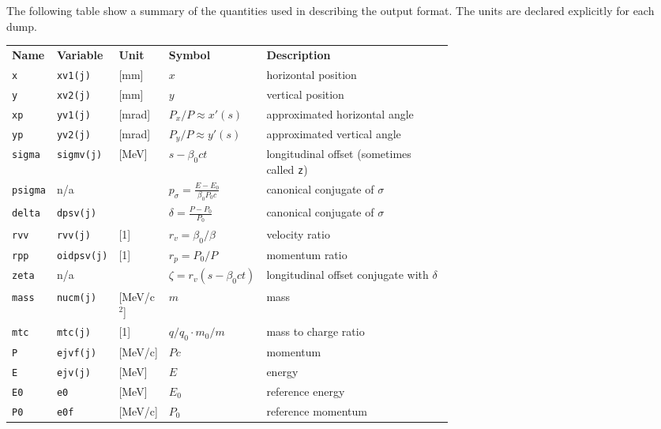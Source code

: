 The following table show a summary of the quantities used in describing the output format. The units are declared explicitly for each dump. 

\bigskip
\begin{longtabu}{@{}llllp{0.65\linewidth}}
    \textbf{Name}   & \textbf{Variable} & \textbf{Unit} & \textbf{Symbol} & \textbf{Description} \\
    \texttt{x}      & \texttt{xv1(j)}    & [mm]         & $x$                  & horizontal position\\
    \texttt{y}      & \texttt{xv2(j)}    & [mm]         & $y$                  & vertical position\\
    \texttt{xp}     & \texttt{yv1(j)}    & [mrad]       & $P_x/P\approx x'(s)$ & approximated horizontal angle\\
    \texttt{yp}     & \texttt{yv2(j)}    & [mrad]       & $P_y/P\approx y'(s)$ & approximated vertical angle\\
    \texttt{sigma}  & \texttt{sigmv(j)}  & [MeV]        & $s-\beta_0 c t $     & longitudinal offset (sometimes called \texttt{z})\\
    \texttt{psigma} & n/a                &              & $ p_\sigma=\frac{E-E_0}{\beta_0 P_0 c}$ & canonical conjugate of $\sigma$ \\
    \texttt{delta}  & \texttt{dpsv(j)}   &              & $ \delta=\frac{P-P_0}{P_0}$ & canonical conjugate of $\sigma$ \\
    \texttt{rvv}    & \texttt{rvv(j)}    & [1]          & $r_v=\beta_0/\beta$  & velocity ratio \\
    \texttt{rpp}    & \texttt{oidpsv(j)} & [1]          & $r_p=P_0/P$          & momentum ratio \\
    \texttt{zeta}   & n/a                &              & $\zeta=r_v(s-\beta_0 c t)$ & longitudinal offset conjugate with $\delta$\\
    \texttt{mass}   & \texttt{nucm(j)}   & [MeV/c$^2$]  & $m$                  & mass \\
    \texttt{mtc}    & \texttt{mtc(j)}    & [1]          & $q/q_0 \cdot m_0/m $ & mass to charge ratio\\
    \texttt{P}      & \texttt{ejvf(j)}   & [MeV/c]      & $Pc$                 & momentum \\
    \texttt{E}      & \texttt{ejv(j)}    & [MeV]        & $E$                  & energy \\
    \texttt{E0}     & \texttt{e0}        & [MeV]        & $E_0$                & reference energy \\
    \texttt{P0}     & \texttt{e0f}       & [MeV/c]      & $P_0$                & reference momentum \\
\end{longtabu}

